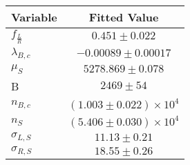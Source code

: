 \begin{tabular}[t]{lc}
\hline
Variable &Fitted Value\\
\hline\hline
$f_{\frac{L}{R}}$&$0.451\pm0.022$\\
\hline
$\lambda_{B,c}$&$-0.00089\pm0.00017$\\
\hline
$\mu_S$&$5278.869\pm0.078$\\
\hline
B&$2469\pm54$\\
\hline
$n_{B,c}$&$(1.003\pm0.022)\times 10^4$\\
\hline
$n_S$&$(5.406\pm0.030)\times 10^4$\\
\hline
$\sigma_{L, S}$&$11.13\pm0.21$\\
\hline
$\sigma_{R, S}$&$18.55\pm0.26$\\
\hline
\end{tabular}